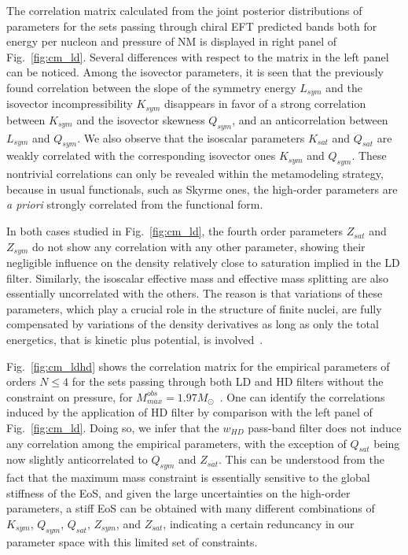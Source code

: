 The correlation matrix calculated from the joint posterior distributions of
parameters for the sets passing through chiral EFT predicted bands both for 
energy per nucleon and pressure of NM is displayed in right panel of 
Fig.~\ref{fig:cm_ld}. Several differences with respect to the matrix in the 
left panel can be noticed.
Among the isovector parameters, it is seen that the previously found 
correlation between the slope of the symmetry energy $L_{sym}$ and the 
isovector incompressibility $K_{sym}$ disappears in favor of a strong 
correlation between $K_{sym}$ and the isovector skewness $Q_{sym}$, and an 
anticorrelation between $L_{sym}$ and $Q_{sym}$. We also observe that the 
isoscalar parameters $K_{sat}$ and $Q_{sat}$ are weakly correlated with the 
corresponding isovector ones $K_{sym}$ and $Q_{sym}$. These nontrivial 
correlations can only be revealed within the metamodeling strategy, because in 
usual functionals, such as Skyrme ones, the high-order parameters 
are \textit{a priori} strongly correlated from the functional form. 

In both cases studied in Fig.~\ref{fig:cm_ld}, the fourth order parameters 
$Z_{sat}$ and $Z_{sym}$ do not show any correlation with any other parameter, 
showing their negligible influence on the density relatively close to 
saturation implied in the LD filter. Similarly, the isoscalar effective mass 
and effective mass splitting are also essentially uncorrelated 
with the others. The reason is that variations of these parameters, which play 
a crucial role in the structure of finite nuclei, are fully compensated by 
variations of the density derivatives as long as only the total energetics, 
that is kinetic plus potential, is involved~\cite{Chatterjee2017}.

Fig.~\ref{fig:cm_ldhd} shows the correlation matrix for the empirical 
parameters of orders $N \leq 4$ for the sets passing through both LD and HD 
filters without the constraint on pressure, for
$M_{max}^{obs}=1.97M_\odot$~\cite{Antoniadis2013}. One can identify the 
correlations induced by the application of HD filter by comparison with the 
left panel of Fig.~\ref{fig:cm_ld}. Doing so, we infer that the $w_{HD}$ 
pass-band filter does not induce any correlation among the 
empirical parameters, with the exception of $Q_{sat}$ being now slightly 
anticorrelated to $Q_{sym}$ and $Z_{sat}$. 
%
This can be understood from the fact that the maximum mass constraint is
essentially sensitive to the global stiffness of the EoS, and given the large 
uncertainties on the high-order parameters, a stiff EoS can be obtained with
many different combinations of $K_{sym}$, $Q_{sym}$, $Q_{sat}$, $Z_{sym}$, and
$Z_{sat}$, indicating a certain reduncancy in our parameter space with this
limited set of constraints.

